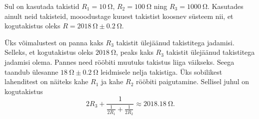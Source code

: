 
Sul on kasutada takistid $R_1=\SI{10}{\ohm}$, $R_2=\SI{100}{\ohm}$ ning $R_3=\SI{1000}{\ohm}$. Kasutades ainult neid takisteid, mooodustage kuuest takistist koosnev süsteem nii, et kogutakistus oleks $R=\SI{2018}{\ohm}\pm\SI{0,2}{\ohm}$.




\hint
Üks võimalustest on panna kaks $R_3$ takistit ülejäänud takistitega jadamisi.\solu
Selleks, et kogutakistus oleks $\SI{2018}{\ohm}$, peaks kaks $R_3$ takistit ülejäänud takistitega jadamisi olema. Pannes need rööbiti muutuks takistus liiga väikseks. Seega taandub ülesanne $\SI{18}{\ohm}\pm\SI{0.2}{\ohm}$ leidmisele nelja takistiga. Üks sobilikest lahenditest on näiteks kahe $R_1$ ja kahe $R_2$ rööbiti paigutamine. Sellisel juhul on kogutakistus
\[
2R_3 + \frac{1}{\frac{1}{2R_1} + \frac{1}{2R_2}} \approx \SI{2018.18}{\ohm}.
\]\probend